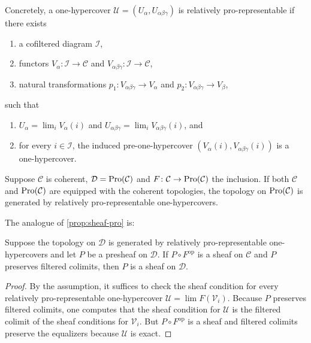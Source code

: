 \noindent Concretely, a one-hypercover $\mathcal{U} = (U_{\alpha}, U_{\alpha \beta \gamma})$ is
relatively pro-representable if there exists
\begin{enumerate}
    \item a cofiltered diagram $\mathcal{I}$,
    \item functors $V_{\alpha}\colon \mathcal{I} \to \mathcal{C}$ and
        $V_{\alpha \beta \gamma}\colon \mathcal{I} \to \mathcal{C}$,
    \item natural transformations $p_1 \colon V_{\alpha \beta \gamma} \to V_{\alpha}$ and
        $p_2\colon V_{\alpha \beta \gamma} \to V_{\beta}$,
\end{enumerate}
such that
\begin{enumerate}
    \item $U_{\alpha} = \lim_i V_{\alpha}(i)$ and $U_{\alpha \beta \gamma} = \lim_i V_{\alpha \beta \gamma}(i)$, and
    \item for every $i \in \mathcal{I}$, the induced pre-one-hypercover $(V_{\alpha}(i), V_{\alpha \beta \gamma}(i))$
        is a one-hypercover.
\end{enumerate}

\begin{example}
    Suppose $\mathcal{C}$ is coherent, $\mathcal{D} = \mathrm{Pro}(\mathcal{C})$ and
    $F \colon \mathcal{C} \to \mathrm{Pro}(\mathcal{C})$ the inclusion. If
    both $\mathcal{C}$ and $\mathrm{Pro}(\mathcal{C})$ are equipped with the coherent topologies,
    the topology on $\mathrm{Pro}(\mathcal{C})$ is generated by relatively pro-representable
    one-hypercovers.
\end{example}

The analogue of \ref{prop:sheaf-pro} is:

\begin{proposition}
    Suppose the topology on $\mathcal{D}$ is generated by relatively pro-representable
    one-hypercovers and let $P$ be a presheaf on $\mathcal{D}$. If
    $P \circ F^{\mathrm{op}}$ is a sheaf on $\mathcal{C}$ and
    $P$ preserves filtered colimits, then $P$ is a sheaf on $\mathcal{D}$.
    \label{prop:sheaf-relatively-representable-generated}
    \leanok
\end{proposition}

\begin{proof}
    \leanok
    By the assumption, it suffices to check the sheaf condition for every
    relatively pro-representable one-hypercover $\mathcal{U} = \lim F(\mathcal{V}_i)$.
    Because $P$ preserves filtered colimits, one computes that
    the sheaf condition for $\mathcal{U}$ is the filtered colimit
    of the sheaf conditions for $\mathcal{V}_i$. But
    $P \circ F^{\mathrm{op}}$ is a sheaf and filtered colimits preserve
    the equalizers because $\mathcal{U}$ is exact.
\end{proof}

